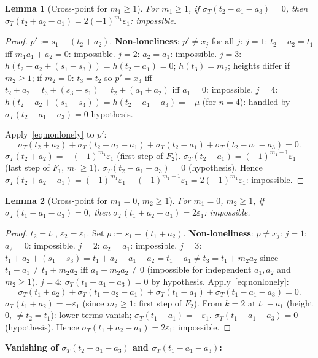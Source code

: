 \documentclass{article}
\newtheorem{lemma}{Lemma}
\begin{document}
\begin{lemma}[Cross-point for $m_1\ge 1$]\label{lem:cross}
For $m_1\ge 1$, if $\sigma_T(t_2-a_1-a_3)=0$, then $\sigma_T(t_2+a_2-a_1)=2(-1)^{m_1}\varepsilon_1$: impossible.
\end{lemma}
\begin{proof}
$p':=s_1+(t_2+a_2)$.
\textbf{Non-loneliness}: $p'\ne x_j$ for all $j$:
$j=1$: $t_2+a_2=t_1$ iff $m_1a_1+a_2=0$: impossible.
$j=2$: $a_2=a_1$: impossible.
$j=3$: $h(t_2+a_2+(s_1-s_3))=h(t_2-a_1)=0$; $h(t_3)=m_2$; heights differ if $m_2\ge 1$; if $m_2=0$: $t_3=t_2$ so $p'=x_3$ iff $t_2+a_2=t_3+(s_3-s_1)=t_2+(a_1+a_2)$ iff $a_1=0$: impossible.
$j=4$: $h(t_2+a_2+(s_1-s_4))=h(t_2-a_1-a_3)=-\mu$ (for $n=4$): handled by $\sigma_T(t_2-a_1-a_3)=0$ hypothesis.

Apply~\eqref{eq:nonlonely} to $p'$:
\[
\sigma_T(t_2+a_2)+\sigma_T(t_2+a_2-a_1)+\sigma_T(t_2-a_1)+\sigma_T(t_2-a_1-a_3)=0.
\]
$\sigma_T(t_2+a_2)=-(-1)^{m_1}\varepsilon_1$ (first step of $F_2$).
$\sigma_T(t_2-a_1)=(-1)^{m_1-1}\varepsilon_1$ (last step of $F_1$, $m_1\ge 1$).
$\sigma_T(t_2-a_1-a_3)=0$ (hypothesis).
Hence $\sigma_T(t_2+a_2-a_1)=(-1)^{m_1}\varepsilon_1-(-1)^{m_1-1}\varepsilon_1=2(-1)^{m_1}\varepsilon_1$: impossible.
\end{proof}

\begin{lemma}[Cross-point for $m_1=0$, $m_2\ge 1$]\label{lem:cross0}
For $m_1=0$, $m_2\ge 1$, if $\sigma_T(t_1-a_1-a_3)=0$, then $\sigma_T(t_1+a_2-a_1)=2\varepsilon_1$: impossible.
\end{lemma}
\begin{proof}
$t_2=t_1$, $\varepsilon_2=\varepsilon_1$.  Set $p:=s_1+(t_1+a_2)$.
\textbf{Non-loneliness}: $p\ne x_j$:
$j=1$: $a_2=0$: impossible.
$j=2$: $a_2=a_1$: impossible.
$j=3$: $t_1+a_2+(s_1-s_3)=t_1+a_2-a_1-a_2=t_1-a_1\ne t_3=t_1+m_2a_2$ since $t_1-a_1\ne t_1+m_2a_2$ iff $a_1+m_2a_2\ne 0$ (impossible for independent $a_1,a_2$ and $m_2\ge 1$).
$j=4$: $\sigma_T(t_1-a_1-a_3)=0$ by hypothesis.
Apply~\eqref{eq:nonlonely}:
\[
\sigma_T(t_1+a_2)+\sigma_T(t_1+a_2-a_1)+\sigma_T(t_1-a_1)+\sigma_T(t_1-a_1-a_3)=0.
\]
$\sigma_T(t_1+a_2)=-\varepsilon_1$ (since $m_2\ge 1$: first step of $F_2$).
From $k=2$ at $t_1-a_1$ (height $0$, $\ne t_2=t_1$): lower terms vanish; $\sigma_T(t_1-a_1)=-\varepsilon_1$.
$\sigma_T(t_1-a_1-a_3)=0$ (hypothesis).
Hence $\sigma_T(t_1+a_2-a_1)=2\varepsilon_1$: impossible.
\end{proof}

\noindent\textbf{Vanishing of $\sigma_T(t_2-a_1-a_3)$ and $\sigma_T(t_1-a_1-a_3)$:}
\end{document}
